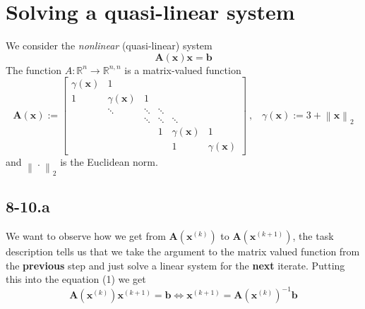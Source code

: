 \documentclass{article}
\begin{document}
\section*{Solving a quasi-linear system}
We consider the \textit{nonlinear} (quasi-linear) system
\begin{equation}
    \mathbf{A}\left(\mathbf{x}\right)\mathbf{x} = \mathbf{b}
\end{equation}
The function $A : \mathbb{R}^{n} \to \mathbb{R}^{n,n}$ is a matrix-valued function
\begin{equation*}
    \mathbf{A}\left(\mathbf{x}\right) := \begin{bmatrix}
        \gamma\left(\mathbf{x}\right) & 1 & & &  \\
        1 & \gamma\left(\mathbf{x}\right) & 1 &&\\
        & \ddots & \ddots & \ddots && \\
        &&\ddots & \ddots & \ddots & \\
        &&& 1 & \gamma\left(\mathbf{x}\right) & 1 \\
        &&&& 1 & \gamma\left(\mathbf{x}\right) 
    \end{bmatrix} \: \text{,} \quad \gamma\left(\mathbf{x}\right) := 3 + \left\lVert \mathbf{x}\right\rVert_{2}
\end{equation*}
and  $\left\lVert\:.\:\right\rVert_{2}$ is the Euclidean norm.
\subsection*{8-10.a} 
We want to observe how we get from $ \mathbf{A}\left(\mathbf{x}^{\left(k\right)}\right)$ to $ \mathbf{A}\left(\mathbf{x}^{\left(k+1\right)}\right)$, the task description tells us that we take the argument to the matrix valued function from the \textbf{previous} step and just solve a linear system for the \textbf{next} iterate. Putting this into the equation (1) we get
\begin{equation*}
    \mathbf{A}\left(\mathbf{x}^{\left(k\right)}\right)\mathbf{x}^{\left(k+1\right)} = \mathbf{b} \Longleftrightarrow \mathbf{x}^{\left(k+1\right)} = \mathbf{A}\left(\mathbf{x}^{\left(k\right)}\right)^{-1}\mathbf{b}
\end{equation*}
\end{document}
